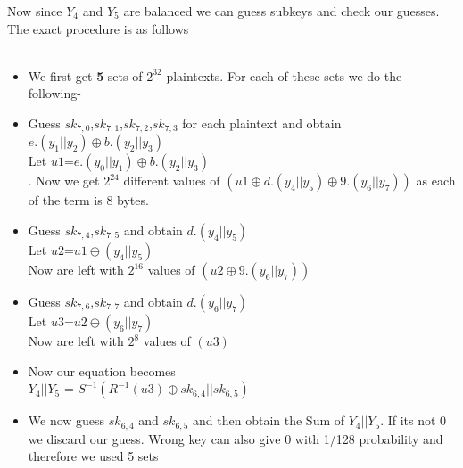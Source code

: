 \documentclass[preprint]{transcrypto}
\begin{document}
Now since $Y_{4}$ and $Y_{5}$ are balanced we can guess subkeys and check our guesses. \\ The exact procedure is as follows \\ \\
\begin{itemize}
	\item We first get \textbf{5} sets of $2^{32}$ plaintexts. For each of these sets we do the following-
	\item Guess $sk_{7,0}$,$sk_{7,1}$,$sk_{7,2}$,$sk_{7,3}$ for each plaintext and obtain $e.(y_{1}||y_{2})\oplus b.(y_{2}||y_{3})$\\
	Let $u1$=$e.(y_{0}||y_{1})\oplus b.(y_{2}||y_{3})$ \\.
	Now we get $2^{24}$ different values of $(u1\oplus d.(y_{4}||y_{5})\oplus9.(y_{6}|| y_{7}))$ as each of the term is 8 bytes.
	
	\item Guess $sk_{7,4}$,$sk_{7,5}$ and obtain 
	$d.(y_{4}||y_{5})$\\
	Let $u2$=$u1 \oplus (y_{4}||y_{5})$  \\  
	Now are left with $2^{16}$ values of $(u2\oplus9.(y_{6}|| y_{7}))$ \\
	\item Guess $sk_{7,6}$,$sk_{7,7}$ and obtain 
	$d.(y_{6}||y_{7})$\\
	Let $u3$=$u2 \oplus (y_{6}||y_{7})$  \\  
	Now are left with $2^8$ values of $(u3)$ \\
	 \item Now our equation becomes \\
	 $Y_{4}||Y_{5}$ = $S^{-1}(R^{-1}(u3)
	 \oplus sk_{6,4} || sk_{6,5})$\\
	 \item We now guess $sk_{6,4}$ and $sk_{6,5}$ and then obtain the Sum of $Y_{4}||Y_{5}$. If its not 0 we discard our guess. Wrong key can also give 0  with 1/128 probability and therefore we used 5 sets
\end{itemize}
\end{document}
